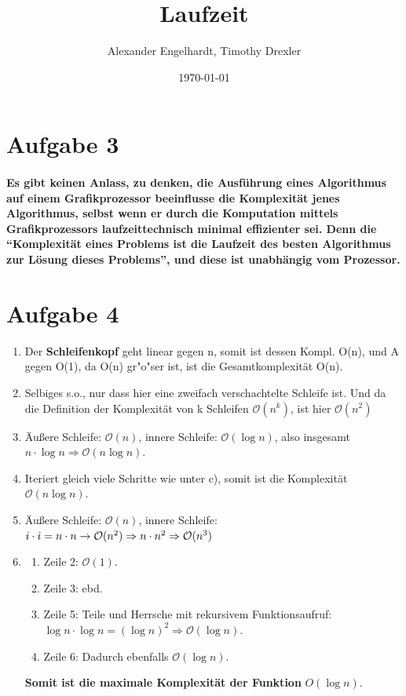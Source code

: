 \documentclass[12pt,a4paper]{article}
\title{Laufzeit}
\author{Alexander Engelhardt, Timothy Drexler}
\date{\today}
\begin{document}
    \maketitle
    \section*{Aufgabe 3}
    \paragraph{Es gibt keinen Anlass, zu denken, die Ausführung eines Algorithmus
     auf einem Grafikprozessor beeinflusse die Komplexität jenes Algorithmus, selbst
     wenn er durch die Komputation mittels Grafikprozessors laufzeittechnisch minimal
     effizienter sei. Denn die
        ``Komplexität eines Problems ist die Laufzeit des besten Algorithmus zur Lösung dieses Problems'',
        und diese ist unabhängig vom Prozessor.}
    
    \section*{Aufgabe 4}
        \begin{enumerate}
            \item[a)] Der \textbf{Schleifenkopf} geht linear gegen n, somit ist dessen Kompl. O(n), und 
            A gegen O(1), da O(n) gr"o"ser ist, ist die Gesamtkomplexität O(n).
            \item[b)] Selbiges s.o., nur dass hier eine zweifach verschachtelte Schleife ist. Und da die
            Definition der Komplexität von k Schleifen $\mathcal{O}(n^k)$, ist hier $\mathcal{O}(n^2)$
            \item[c)] Äußere Schleife: $\mathcal{O}(n)$, innere Schleife: $\mathcal{O}(\log n)$,
            also insgesamt $n \cdot \log n \Rightarrow \mathcal{O}(n\log n)$.
            \item[d)] Iteriert gleich viele Schritte wie unter c), somit ist die Komplexität $\mathcal{O}(n\log n)$.
            \item[e)] Äußere Schleife: $\mathcal{O}(n)$, innere Schleife: $i \cdot i = n \cdot n \rightarrow \mathcal{O}(n^2)
            \Rightarrow n \cdot n^2 \\ \Rightarrow \mathcal{O}(n^3)$
            \item[f)] \begin{enumerate}
                \item Zeile 2: $\mathcal{O}(1)$.
                \item Zeile 3: ebd.
                \item Zeile 5: Teile und Herrsche mit rekursivem Funktionsaufruf: $\log n \cdot \log n = (\log n)^2 \Rightarrow \mathcal{O}(\log n)$.
                \item Zeile 6: Dadurch ebenfalls $\mathcal{O}(\log n)$.
            \end{enumerate}
            \textbf{Somit ist die maximale Komplexität der Funktion} $\mathit{O}(\log n)$.
        \end{enumerate}
\end{document}
